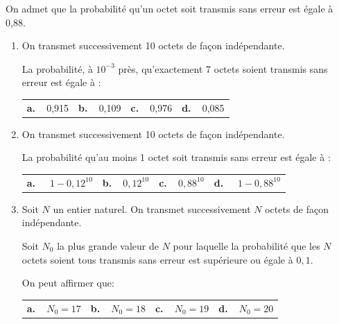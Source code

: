 \documentclass[10pt]{article}
\begin{document}
On admet que la probabilité qu'un octet soit transmis sans erreur est égale à 0,88.

\begin{enumerate}[resume]
\item On transmet successivement 10 octets de façon indépendante.

La probabilité, à $10^{-3}$ près, qu'exactement 7 octets soient transmis sans erreur est égale à :

\begin{center}
\begin{tabularx}{\linewidth}{*{4}{X}}
\textbf{a.~~}0,915 &\textbf{b.~~}0,109 &\textbf{c.~~}0,976 &\textbf{d.~~}0,085
\end{tabularx}
\end{center}
\item On transmet successivement 10 octets de façon indépendante.

La probabilité qu'au moins 1 octet soit transmis sans erreur est égale à :

\begin{center}
\begin{tabularx}{\linewidth}{*{4}{X}}
\textbf{a.~~} $1 - 0,12^{10}$ &\textbf{b.~~}$0,12^{10}$ &\textbf{c.~~}$0,88^{10}$ &\textbf{d.~~} $1- 0,88^{10}$
\end{tabularx}
\end{center}
\item Soit $N$ un entier naturel. On transmet successivement $N$ octets de façon indépendante. 

Soit $N_0$ la plus grande valeur de $N$ pour laquelle la probabilité que les $N$ octets soient tous transmis sans erreur est supérieure ou égale à $0,1$.

On peut affirmer que:

\begin{center}
\begin{tabularx}{\linewidth}{*{4}{X}}
\textbf{a.~~}$N_0 = 17$ &\textbf{b.~~}$N_0 = 18$ &\textbf{c.~~}$N_0 = 19$ &\textbf{d.~~}$N_0 = 20$
\end{tabularx}
\end{center}
\end{enumerate}
\end{document}
